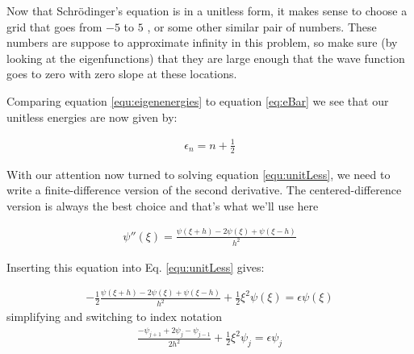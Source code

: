 \vspace{0.25in}
\noindent Now that Schr\"{o}dinger's equation is in a unitless form, it makes
sense to choose a grid that goes from $-5$ to $5$ , or some other
similar pair of numbers.  These numbers are suppose to approximate
infinity in this problem, so make sure (by looking at the
eigenfunctions) that they are large enough that the wave function goes
to zero with zero slope at these locations.

Comparing equation \eqref{equ:eigenenergies} to equation
\eqref{eq:eBar} we see that our unitless energies are now given by:

\begin{align}
\epsilon_n = n + \frac{1}{2}
\end{align}


With our attention now turned to solving equation
\eqref{equ:unitLess}, we need to write a finite-difference version of
the second derivative.  The centered-difference version is always the best
choice and that's what we'll use here

\begin{align}
\psi''(\xi) = \frac{\psi(\xi + h) - 2 \psi(\xi) + \psi(\xi - h)}{h^2}\label{equ:centeredsecond}
\end{align}

Inserting this equation into Eq. \eqref{equ:unitLess} gives:

\begin{align}
-\frac{1}{2} \frac{\psi(\xi + h) - 2 \psi(\xi) + \psi(\xi - h)}{h^2} + \frac{1}{2} \xi^2\psi(\xi) = \epsilon \psi(\xi)
\end{align}
simplifying and switching to index notation
\begin{align}
\frac{-\psi_{j+1} + 2 \psi_j - \psi_{j-1}}{2 h^2} + \frac{1}{2} \xi^2\psi_j = \epsilon \psi_j\label{eq:finiteDiff}
\end{align}

